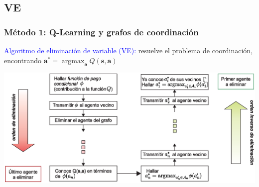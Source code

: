 \documentclass[11pt]{beamer}
\DeclareMathOperator*{\argmax}{argmax}
\begin{document}
\subsection{VE}
\begin{frame}
\frametitle{Método 1: Q-Learning y grafos de coordinación}
\textcolor{blue}{Algoritmo de eliminación de variable (VE): }resuelve el problema de coordinación, encontrando $\mathbf{a}^*=\argmax_{\mathbf{a}}Q(\mathbf{s},\mathbf{a})$\\
\begin{center}
\includegraphics[scale=0.48]{./graficas/ve.eps}
\end{center}
\end{frame}
\end{document}
